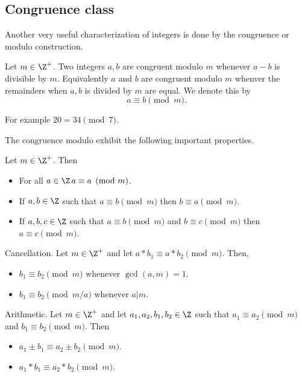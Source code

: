 \subsection{Congruence class}
Another very useful characterization of integers is done by the congruence or modulo construction.
\begin{Definition}
    Let $m \in \Z^{+}$. Two integers $a,b$ are congruent modulo $m$ whenever $a-b$ is divisible by
    $m$. Equivalently $a$ and $b$ are congruent modulo $m$ whenver the remainders when $a,b$ is
    divided by $m$ are equal. We denote this by
    \begin{equation*}
	a \equiv b \pmod m.
    \end{equation*}
\end{Definition}
For example $20 = 34 \pmod 7$.

The congruence modulo exhibit the following important properties.
\begin{Proposition}
    Let $m \in \Z^{+}$. Then
    \begin{itemize}
	\item For all $a \in \Z \, a \equiv a \pmod m$.
	\item If $a,b \in \Z$ such that $a \equiv b \pmod m$ then $b \equiv a \pmod m$.
	\item If $a,b,c \in \Z$ such that $a \equiv b \pmod m$ and $ b \equiv c \pmod m$ then $a
	    \equiv c \pmod m$.
    \end{itemize}
\end{Proposition}

\begin{Proposition}
    Cancellation. Let $m \in \Z^{+}$ and let $a*b_1 \equiv a*b_2 \pmod m$. Then,
    \begin{itemize}
	\item $b_1 \equiv b_2 \pmod m \text{ whenever } \gcd(a,m) = 1$. 
	\item $b_1 \equiv b_2 \pmod {m/a} \text{ whenever } a | m $. 
    \end{itemize}
\end{Proposition}

\begin{Proposition}
    Arithmetic. Let $m \in \Z^{+}$ and let $a_1,a_2,b_1,b_2 \in \Z$ such that $a_1 \equiv a_2 \pmod
    m$ and $b_1 \equiv b_2 \pmod m$. Then
    \begin{itemize}
	\item $a_1 \pm b_1 \equiv a_2 \pm b_2 \pmod m$. 
	\item $a_1*b_1 \equiv a_2*b_2 \pmod m$.
    \end{itemize}
\end{Proposition}

